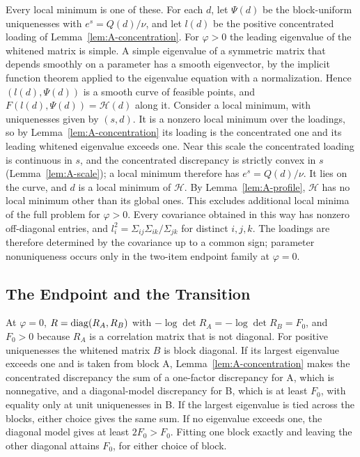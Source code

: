 Every local minimum is one of these. For each $d$, let $\Psi(d)$ be the block-uniform uniquenesses with $e^s=Q(d)/\nu$, and let $l(d)$ be the positive concentrated loading of Lemma~\ref{lem:A-concentration}. For $\varphi>0$ the leading eigenvalue of the whitened matrix is simple. A simple eigenvalue of a symmetric matrix that depends smoothly on a parameter has a smooth eigenvector, by the implicit function theorem applied to the eigenvalue equation with a normalization. Hence $(l(d),\Psi(d))$ is a smooth curve of feasible points, and $F(l(d),\Psi(d))=\mathcal H(d)$ along it. Consider a local minimum, with uniquenesses given by $(s,d)$. It is a nonzero local minimum over the loadings, so by Lemma~\ref{lem:A-concentration} its loading is the concentrated one and its leading whitened eigenvalue exceeds one. Near this scale the concentrated loading is continuous in $s$, and the concentrated discrepancy is strictly convex in $s$ (Lemma~\ref{lem:A-scale}); a local minimum therefore has $e^s=Q(d)/\nu$. It lies on the curve, and $d$ is a local minimum of $\mathcal H$. By Lemma~\ref{lem:A-profile}, $\mathcal H$ has no local minimum other than its global ones. This excludes additional local minima of the full problem for $\varphi>0$. Every covariance obtained in this way has nonzero off-diagonal entries, and $l_i^2=\Sigma_{ij}\Sigma_{ik}/\Sigma_{jk}$ for distinct $i,j,k$. The loadings are therefore determined by the covariance up to a common sign; parameter nonuniqueness occurs only in the two-item endpoint family at $\varphi=0$.

\subsection{The Endpoint and the Transition}

At $\varphi=0$, $R=\operatorname{diag}(R_A,R_B)$ with $-\log\det R_A=-\log\det R_B=F_0$, and $F_0>0$ because $R_A$ is a correlation matrix that is not diagonal. For positive uniquenesses the whitened matrix $B$ is block diagonal. If its largest eigenvalue exceeds one and is taken from block A, Lemma~\ref{lem:A-concentration} makes the concentrated discrepancy the sum of a one-factor discrepancy for A, which is nonnegative, and a diagonal-model discrepancy for B, which is at least $F_0$, with equality only at unit uniquenesses in B. If the largest eigenvalue is tied across the blocks, either choice gives the same sum. If no eigenvalue exceeds one, the diagonal model gives at least $2F_0>F_0$. Fitting one block exactly and leaving the other diagonal attains $F_0$, for either choice of block.

